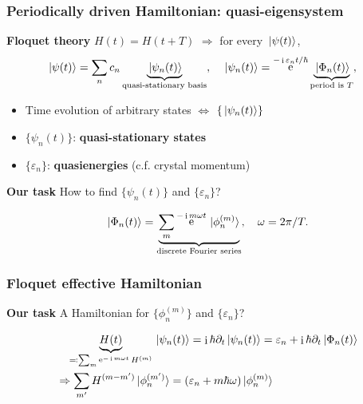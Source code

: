 \documentclass[t]{beamer}
\DeclareMathOperator{\ee}{e}
\DeclareMathOperator{\ii}{i}
\newcommand{\concept}[1]{\textbf{#1}}
\begin{document}
\begin{frame}
\frametitle{Periodically driven Hamiltonian: quasi-eigensystem}

\textbf{Floquet theory} $H(t) = H(t + T)$ $\Rightarrow$ 
for every $\ket*{\psi(t)}$, 
\begin{equation*}
    \begin{aligned}
        &\ket*{\psi(t)} = \sum_n c_n \underbrace{\ket*{\psi_n(t)}}_{\text{quasi-stationary basis}} , \quad 
        \ket*{\psi_n(t)} = \ee^{- \ii \varepsilon_n t / \hbar} \underbrace{
            \ket*{\Phi_n(t)}
        }_\text{period is $T$} ,
    \end{aligned}
\end{equation*}

\begin{itemize}
    \item Time evolution of arbitrary states $\Leftrightarrow$ $\{\ket*{\psi_n(t)}\}$
    \item $\{\psi_n(t)\}$: \concept{quasi-stationary states}
    \item $\{\varepsilon_n\}$: \concept{quasienergies} (c.f. crystal momentum)
\end{itemize}

\vspace{0.5cm}

\textbf{Our task} How to find $\{ \psi_n(t) \}$ and $\{ \varepsilon_n \}$?

\begin{equation*}
    \ket*{\Phi_n(t)} = \underbrace{\sum_m \ee^{- \ii m \omega t} \ket*{\phi_n^{(m)}}}_{\text{discrete Fourier series}} , \quad 
    \omega = 2\pi / T. 
\end{equation*}


\end{frame}

\begin{frame}
\frametitle{Floquet effective Hamiltonian}

\textbf{Our task} A Hamiltonian for $\{ \phi_n^{(m)} \}$ and $\{ \varepsilon_n \}$? 

\[
    \begin{aligned}
        &\quad 
        \underbrace{H(t)}_{\eqqcolon \sum_m \ee^{- \ii m \omega t} H^{(m)}} \ket*{\psi_n(t)} = \ii \hbar \partial_t \ket*{\psi_n(t)} = \varepsilon_n + \ii \hbar \partial_t \ket*{\Phi_n(t)} \\
        &\Rightarrow \sum_{m'} H^{(m - m')} \ket*{\phi^{(m')}_n} = (\varepsilon_n + m \hbar \omega) \ket*{\phi_n^{(m)}} 
    \end{aligned}
\]


\end{frame}
\end{document}
